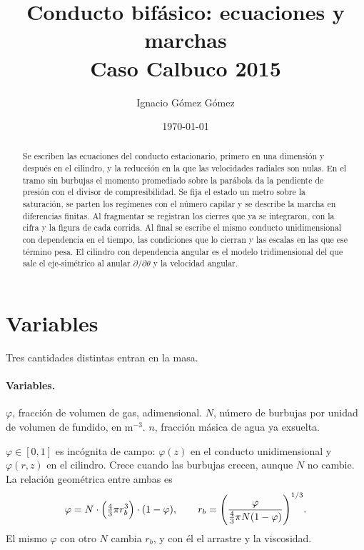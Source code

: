 \documentclass[11pt,a4paper]{article}
\title{\vspace{-1.2cm}\textbf{Conducto bifásico: ecuaciones y marchas}\\[0.25em]
\large Caso Calbuco 2015}
\author{Ignacio Gómez Gómez}
\date{\today}
\begin{document}
\maketitle
\vspace{-0.7cm}

\begin{abstract}\noindent
Se escriben las ecuaciones del conducto estacionario, primero en una
dimensión y después en el cilindro, y la reducción en la que las
velocidades radiales son nulas. En el tramo sin burbujas el momento
promediado sobre la parábola da la pendiente de presión con el divisor
de compresibilidad. Se fija el estado un metro sobre la saturación, se
parten los regímenes con el número capilar y se describe la marcha en
diferencias finitas. Al fragmentar se registran los cierres que ya se
integraron, con la cifra y la figura de cada corrida. Al final se
escribe el mismo conducto unidimensional con dependencia en el
tiempo, las condiciones que lo cierran y las escalas en las que
ese término pesa. El cilindro con dependencia angular es el
modelo tridimensional del que sale el eje-simétrico al anular
$\partial/\partial\theta$ y la velocidad angular.
\end{abstract}

\tableofcontents
\vspace{0.4em}

\section{Variables}

Tres cantidades distintas entran en la masa.

\paragraph{Variables.}
$\varphi$, fracción de volumen de gas, adimensional.
$N$, número de burbujas por unidad de volumen de fundido, en
$\mathrm{m^{-3}}$.
$n$, fracción másica de agua ya exsuelta.

$\varphi\in[0,1]$ es incógnita de campo: $\varphi(z)$ en el conducto
unidimensional y $\varphi(r,z)$ en el cilindro. Crece cuando las
burbujas crecen, aunque $N$ no cambie. La relación geométrica entre
ambas es
\begin{equation}
\label{eq:rb}
\varphi
=N\cdot\Bigl(\tfrac43\pi r_b^3\Bigr)\cdot(1-\varphi),
\qquad
r_b
=\Biggl(\frac{\varphi}{\tfrac43\pi N(1-\varphi)}\Biggr)^{1/3}.
\end{equation}
El mismo $\varphi$ con otro $N$ cambia $r_b$, y con él el arrastre y
la viscosidad.
\end{document}
